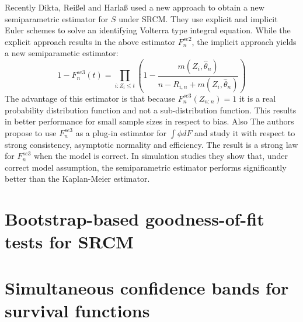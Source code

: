 Recently Dikta, Reißel and Harlaß used a new approach to obtain a new semiparametric estimator for $S$ under SRCM. They use explicit and implicit Euler schemes to solve an identifying Volterra type integral equation. While the explicit approach results in the above estimator $F_n^{se2}$, the implicit approach yields a new semiparametic estimator:
\begin{equation}\label{fnse2}
1-F_n^{se3}(t) = \prod_{i:Z_i \leq t} \left( 1 - \frac{m(Z_i,\hat{\theta}_n)}{n-R_{i,n} + m(Z_i,\hat{\theta}_n)} \right)
\end{equation}
The advantage of this estimator is that because $F_n^{se3}(Z_{n:n}) = 1$ it is a real probability distribution function and not a sub-distribution function. This results in better performance for small sample sizes in respect to bias. Also 
The authors propose to use $F_n^{se3}$ as a plug-in estimator for $\int\phi dF$ and study it with respect to strong consistency, asymptotic normality and efficiency. The result is a strong law for $F_n^{se3}$ when the model is correct. In simulation studies they show that, under correct model assumption, the semiparametric estimator performs significantly better than the Kaplan-Meier estimator\cite{PAPER7}.

\section{Bootstrap-based goodness-of-fit tests for SRCM}

\section{Simultaneous confidence bands for survival functions}